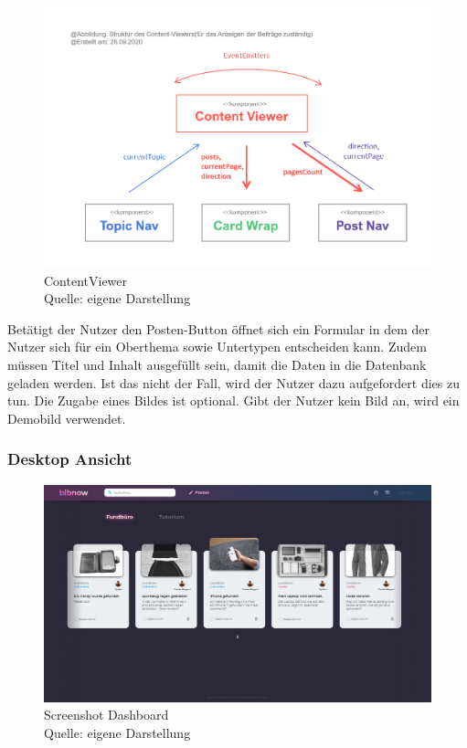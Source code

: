 \documentclass[12pt,titlepage]{article}
\begin{document}
\begin{figure}[hbt!]
\centering
\includegraphics[]{abbildungen/Abbildung_ContentViewer.png}
\caption[ContentViewer]{ContentViewer \\Quelle: eigene Darstellung}
\end{figure}

Betätigt der Nutzer den Posten-Button öffnet sich ein Formular in dem der Nutzer sich für ein Oberthema sowie Untertypen entscheiden kann. Zudem müssen Titel und Inhalt ausgefüllt sein, damit die Daten in die Datenbank geladen werden. Ist das nicht der Fall, wird der Nutzer dazu aufgefordert dies zu tun. Die Zugabe eines Bildes ist optional. Gibt der Nutzer kein Bild an, wird ein Demobild verwendet.

\FloatBarrier

\subsubsection{Desktop Ansicht}

\begin{figure}[hbt!]
\centering
\includegraphics[width=400pt]{screenshots/Screenshot_Desktop_Dashboard.png}
\caption[Sreenshot Dashboard]{Screenshot Dashboard \\Quelle: eigene Darstellung}
\end{figure}
\end{document}

